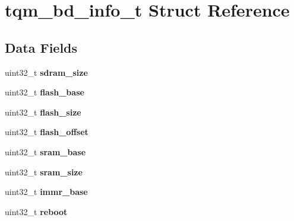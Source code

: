 \hypertarget{structtqm__bd__info__t}{}\section{tqm\+\_\+bd\+\_\+info\+\_\+t Struct Reference}
\label{structtqm__bd__info__t}
\subsection*{Data Fields}
\begin{DoxyCompactItemize}
\item 
\mbox{\label{structtqm__bd__info__t_ac1b5bf1e8813aadd7d223d45365c6dc2}} 
uint32\+\_\+t {\bfseries sdram\+\_\+size}
\item 
\mbox{\label{structtqm__bd__info__t_a65bd8ee9188292c2dffa8ac070331442}} 
uint32\+\_\+t {\bfseries flash\+\_\+base}
\item 
\mbox{\label{structtqm__bd__info__t_a23c6bad445420ad268af6ddfc16f6c3c}} 
uint32\+\_\+t {\bfseries flash\+\_\+size}
\item 
\mbox{\label{structtqm__bd__info__t_a6c4ff25cde6074bf53ad01ebfa9d6e0d}} 
uint32\+\_\+t {\bfseries flash\+\_\+offset}
\item 
\mbox{\label{structtqm__bd__info__t_ada19dd0302761c0f80c993883613a5ff}} 
uint32\+\_\+t {\bfseries sram\+\_\+base}
\item 
\mbox{\label{structtqm__bd__info__t_a769417f9a5e06f6df9dd541448e823ce}} 
uint32\+\_\+t {\bfseries sram\+\_\+size}
\item 
\mbox{\label{structtqm__bd__info__t_a1ef508702d6e26bc52393d5b83b8a5fa}} 
uint32\+\_\+t {\bfseries immr\+\_\+base}
\item 
\mbox{\label{structtqm__bd__info__t_a79df4f46ff453801d481c91f6ce750e3}} 
uint32\+\_\+t {\bfseries reboot}
\item 
\mbox{\label{structtqm__bd__info__t_afca4992354371926f301185cc6a105e9}} 

\end{DoxyCompactItemize}
